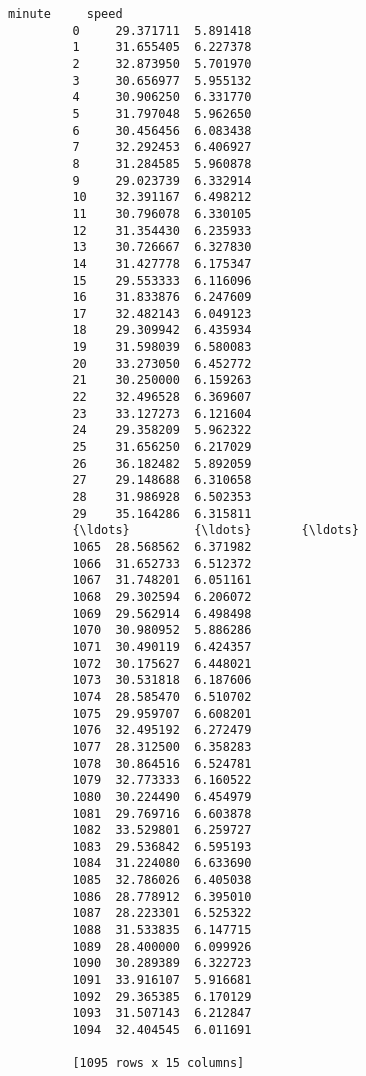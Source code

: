 \documentclass[11pt]{article}
\begin{document}
\begin{Verbatim}[commandchars=\\\{\}]
                  minute     speed  
         0     29.371711  5.891418  
         1     31.655405  6.227378  
         2     32.873950  5.701970  
         3     30.656977  5.955132  
         4     30.906250  6.331770  
         5     31.797048  5.962650  
         6     30.456456  6.083438  
         7     32.292453  6.406927  
         8     31.284585  5.960878  
         9     29.023739  6.332914  
         10    32.391167  6.498212  
         11    30.796078  6.330105  
         12    31.354430  6.235933  
         13    30.726667  6.327830  
         14    31.427778  6.175347  
         15    29.553333  6.116096  
         16    31.833876  6.247609  
         17    32.482143  6.049123  
         18    29.309942  6.435934  
         19    31.598039  6.580083  
         20    33.273050  6.452772  
         21    30.250000  6.159263  
         22    32.496528  6.369607  
         23    33.127273  6.121604  
         24    29.358209  5.962322  
         25    31.656250  6.217029  
         26    36.182482  5.892059  
         27    29.148688  6.310658  
         28    31.986928  6.502353  
         29    35.164286  6.315811  
         {\ldots}         {\ldots}       {\ldots}  
         1065  28.568562  6.371982  
         1066  31.652733  6.512372  
         1067  31.748201  6.051161  
         1068  29.302594  6.206072  
         1069  29.562914  6.498498  
         1070  30.980952  5.886286  
         1071  30.490119  6.424357  
         1072  30.175627  6.448021  
         1073  30.531818  6.187606  
         1074  28.585470  6.510702  
         1075  29.959707  6.608201  
         1076  32.495192  6.272479  
         1077  28.312500  6.358283  
         1078  30.864516  6.524781  
         1079  32.773333  6.160522  
         1080  30.224490  6.454979  
         1081  29.769716  6.603878  
         1082  33.529801  6.259727  
         1083  29.536842  6.595193  
         1084  31.224080  6.633690  
         1085  32.786026  6.405038  
         1086  28.778912  6.395010  
         1087  28.223301  6.525322  
         1088  31.533835  6.147715  
         1089  28.400000  6.099926  
         1090  30.289389  6.322723  
         1091  33.916107  5.916681  
         1092  29.365385  6.170129  
         1093  31.507143  6.212847  
         1094  32.404545  6.011691  
         
         [1095 rows x 15 columns]
\end{Verbatim}
            
\end{document}
